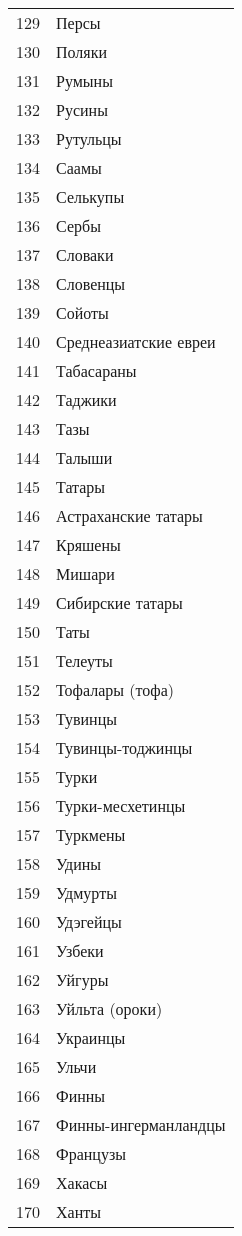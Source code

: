 \documentclass[10pt, a4paper, titlepage]{article}
\begin{document}
\begin{xtabular}{rp{.38\textwidth}}
    129 & Персы \\
    130 & Поляки \\
    131 & Румыны \\
    132 & Русины \\
    133 & Рутульцы \\
    134 & Саамы \\
    135 & Селькупы \\
    136 & Сербы \\
    137 & Словаки \\
    138 & Словенцы \\
    139 & Сойоты \\
    140 & Среднеазиатские евреи \\
    141 & Табасараны \\
    142 & Таджики \\
    143 & Тазы \\
    144 & Талыши \\
    145 & Татары \\
    146 & Астраханские татары \\
    147 & Кряшены \\
    148 & Мишари \\
    149 & Сибирские татары \\
    150 & Таты \\
    151 & Телеуты \\
    152 & Тофалары (тофа) \\
    153 & Тувинцы \\
    154 & Тувинцы-тоджинцы \\
    155 & Турки \\
    156 & Турки-месхетинцы \\
    157 & Туркмены \\
    158 & Удины \\
    159 & Удмурты \\
    160 & Удэгейцы \\
    161 & Узбеки \\
    162 & Уйгуры \\
    163 & Уйльта (ороки) \\
    164 & Украинцы \\
    165 & Ульчи \\
    166 & Финны \\
    167 & Финны-ингерманландцы \\
    168 & Французы \\
    169 & Хакасы \\
    170 & Ханты \\

\end{xtabular}
\end{document}
